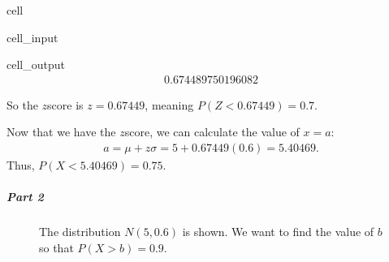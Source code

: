 \documentclass[letterpaper,10pt,english]{jupyterBook}
\begin{document}
\begin{sphinxuseclass}{cell}\begin{sphinxVerbatimInput}

\begin{sphinxuseclass}{cell_input}
\begin{sphinxVerbatim}[commandchars=\\\{\}]
\end{sphinxVerbatim}

\end{sphinxuseclass}\end{sphinxVerbatimInput}
\begin{sphinxVerbatimOutput}

\begin{sphinxuseclass}{cell_output}\begin{equation*}
\begin{split}0.674489750196082\end{split}
\end{equation*}
\end{sphinxuseclass}\end{sphinxVerbatimOutput}

\end{sphinxuseclass}
\sphinxAtStartPar
So the \(z\)\sphinxhyphen{}score is \(z = 0.67449\), meaning \(P(Z < 0.67449) = 0.7\).

\sphinxAtStartPar
Now that we have the \(z\)\sphinxhyphen{}score, we can calculate the value of \(x = a\):
\begin{equation*}
\begin{split} a = \mu + z\sigma = 5 + 0.67449(0.6) = 5.40469. \end{split}
\end{equation*}
\sphinxAtStartPar
Thus, \(P(X < 5.40469) = 0.75\).


\subparagraph{Part 2}
\label{\detokenize{Ch4 The Normal Distribution and the Central Limit Theorem/4.3 The Normal Distribution and z-scores:id7}}
\begin{figure}[htbp]
\centering
\capstart

\noindent{}
\caption{The distribution \(N(5, 0.6)\) is shown. We want to find the value of \(b\) so that \(P(X > b) = 0.9\).}\label{\detokenize{Ch4 The Normal Distribution and the Central Limit Theorem/4.3 The Normal Distribution and z-scores:normal-ex7}}\end{figure}
\end{document}
